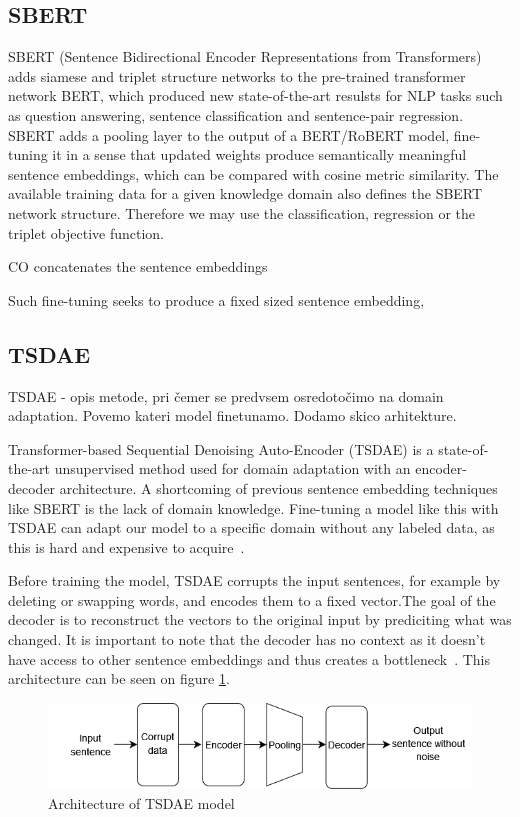 \documentclass[fleqn,moreauthors,10pt]{ds_report}
\begin{document}
\subsection*{SBERT}
SBERT (Sentence Bidirectional Encoder Representations from Transformers) adds siamese and triplet structure networks to the pre-trained transformer network BERT, which produced new state-of-the-art resulsts for NLP tasks such as question answering, sentence classification and sentence-pair regression. SBERT adds a pooling layer to the output of a BERT/RoBERT model, fine-tuning it in a sense that updated weights produce semantically meaningful sentence embeddings, which can be compared with cosine metric similarity. The available training data for a given knowledge domain also defines the SBERT network structure. Therefore we may use the classification, regression or the triplet objective function.

CO concatenates the sentence embeddings 

Such fine-tuning seeks to produce a fixed sized sentence embedding, 

\subsection*{TSDAE}
TSDAE - opis metode, pri čemer se predvsem osredotočimo na domain adaptation. Povemo kateri model finetunamo.
Dodamo skico arhitekture.

Transformer-based Sequential Denoising Auto-Encoder (TSDAE) is a state-of-the-art unsupervised method used for domain adaptation with an encoder-decoder architecture. A shortcoming of previous sentence embedding techniques like SBERT is the lack of domain knowledge. Fine-tuning a model like this with TSDAE can adapt our model to a specific domain without any labeled data, as this is hard and expensive to acquire~\cite{wang-etal-2021-tsdae-using}. 

Before training the model, TSDAE corrupts the input sentences, for example by deleting or swapping words, and encodes them to a fixed vector.The goal of the decoder is to reconstruct the vectors to the original input by prediciting what was changed. It is important to note that the decoder has no context as it doesn't have access to other sentence embeddings and thus creates a bottleneck~\cite{wang-etal-2021-tsdae-using}.  This architecture can be seen on figure \ref{fig:tsdae}.

\begin{figure}[ht]\centering
	\includegraphics[width=\linewidth]{TSDAEdiagram.png}
	\caption{Architecture of TSDAE model}
	\label{fig:tsdae}
\end{figure}
\end{document}
